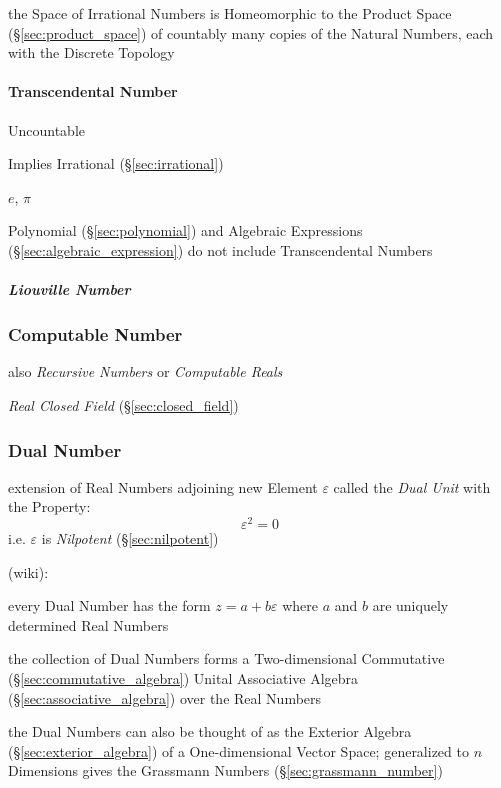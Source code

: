 the Space of Irrational Numbers is Homeomorphic to the Product Space
(\S\ref{sec:product_space}) of countably many copies of the Natural Numbers,
each with the Discrete Topology



\paragraph{Transcendental Number}\label{sec:transcendental}\hfill

Uncountable

Implies Irrational (\S\ref{sec:irrational})

$e$, $\pi$

Polynomial (\S\ref{sec:polynomial}) and Algebraic Expressions
(\S\ref{sec:algebraic_expression}) do not include Transcendental Numbers



\subparagraph{Liouville Number}\label{sec:liouville_number}\hfill



\subsubsection{Computable Number}\label{sec:computable_real}

also \emph{Recursive Numbers} or \emph{Computable Reals}

\emph{Real Closed Field} (\S\ref{sec:closed_field})



\subsubsection{Dual Number}\label{sec:dual_number}

extension of Real Numbers adjoining new Element $\varepsilon$ called the
\emph{Dual Unit} with the Property:
\[
  \varepsilon^2 = 0
\]
i.e. $\varepsilon$ is \emph{Nilpotent} (\S\ref{sec:nilpotent})

(wiki):

every Dual Number has the form $z = a + b\varepsilon$ where $a$ and $b$ are
uniquely determined Real Numbers

the collection of Dual Numbers forms a Two-dimensional Commutative
(\S\ref{sec:commutative_algebra}) Unital Associative Algebra
(\S\ref{sec:associative_algebra}) over the Real Numbers

the Dual Numbers can also be thought of as the Exterior Algebra
(\S\ref{sec:exterior_algebra}) of a One-dimensional Vector Space; generalized to
$n$ Dimensions gives the Grassmann Numbers (\S\ref{sec:grassmann_number})


